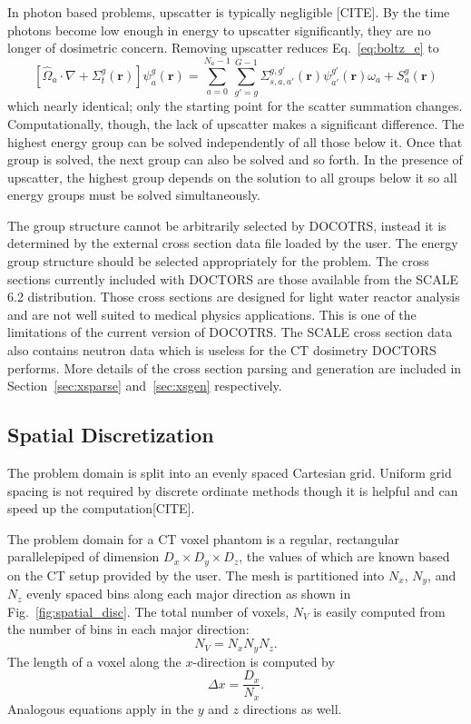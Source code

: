 In photon based problems, upscatter is typically negligible [CITE]. By the time photons become low enough in energy to upscatter significantly, they are no longer of dosimetric concern. Removing upscatter reduces Eq.~\ref{eq:boltz_e} to
\begin{equation} \label{eq:boltz_e2}
\left[ \hat{\Omega}_a \cdot \nabla + \Sigma_t^g(\boldsymbol{r}) \right]
\psi_{a}^{g}(\boldsymbol{r}) = 
\sum_{a=0}^{N_a-1} \sum_{g'=g}^{G-1} \Sigma_{s, a, a'}^{g, g'}(\boldsymbol{r}) \psi_{a'}^{g'}(\boldsymbol{r}) \omega_a + S_a^g(\boldsymbol{r})
\end{equation}
which nearly identical; only the starting point for the scatter summation changes. Computationally, though, the lack of upscatter makes a significant difference. The highest energy group can be solved independently of all those below it. Once that group is solved, the next group can also be solved and so forth. In the presence of upscatter, the highest group depends on the solution to all groups below it so all energy groups must be solved simultaneously.

The group structure cannot be arbitrarily selected by DOCOTRS, instead it is determined by the external cross section data file loaded by the user. The energy group structure should be selected appropriately for the problem. The cross sections currently included with DOCTORS are those available from the SCALE 6.2 distribution. Those cross sections are designed for light water reactor analysis and are not well suited to medical physics applications. This is one of the limitations of the current version of DOCOTRS. The SCALE cross section data also contains neutron data which is useless for the CT dosimetry DOCTORS performs. More details of the cross section parsing and generation are included in Section~\ref{sec:xsparse} and~\ref{sec:xsgen} respectively.

\subsection{Spatial Discretization}

The problem domain is split into an evenly spaced Cartesian grid. Uniform grid spacing is not required by discrete ordinate methods though it is helpful and can speed up the computation[CITE].

The problem domain for a CT voxel phantom is a regular, rectangular parallelepiped of dimension $D_x \times D_y \times D_z$, the values of which are known based on the CT setup provided by the user. The mesh is partitioned into $N_x$, $N_y$, and $N_z$ evenly spaced bins along each major direction as shown in Fig.~\ref{fig:spatial_disc}. The total number of voxels, $N_V$ is easily computed from the number of bins in each major direction:
\begin{equation} \label{eq:n_v}
N_V = N_x N_y N_z.
\end{equation}
The length of a voxel along the $x$-direction is computed by 
\begin{equation} \label{eq:mesh_x}
\Delta x = \frac{D_x}{N_x}.
\end{equation}
Analogous equations apply in the $y$ and $z$ directions as well.

